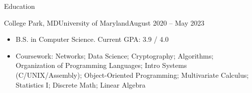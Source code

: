 \documentclass[]{mcdowellcv}
\begin{document}
	\makeheader
	
	\begin{cvsection}{Education}
		\begin{cvsubsection}{College Park, MD}{University of Maryland}{August 2020 -- May 2023}
			\begin{itemize}
				\item B.S. in Computer Science. Current GPA: 3.9 / 4.0
				\item Coursework: Networks; Data Science; Cryptography; Algorithms; Organization of Programming Languages; Intro
					  Systems (C/UNIX/Assembly); Object-Oriented Programming; Multivariate Calculus; Statistics I;
					  Discrete Math; Linear Algebra
			\end{itemize}
		\end{cvsubsection}
	\end{cvsection}
\end{document}
